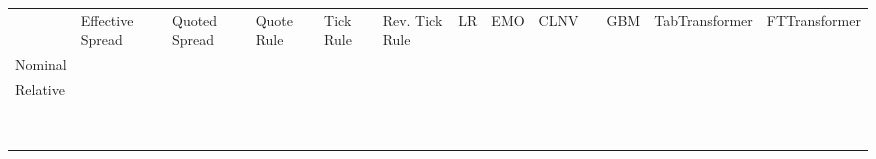 \begin{tabular}{lllllllllllll}
             & Effective Spread & Quoted Spread & Quote Rule & Tick Rule & Rev. Tick Rule & \gls{LR} & \gls{EMO} & \gls{CLNV} & \autocite{grauerOptionTradeClassification2022} & GBM & TabTransformer & FTTransformer \\
    Nominal  &               &               &            &           &                &          &           &            &                                                &     &                &               \\
    Relative &               &               &            &           &                &          &           &            &                                                &     &                &               \\
             &               &               &            &           &                &          &           &            &                                                &     &                &               \\
             &               &               &            &           &                &          &           &            &                                                &     &                &               \\
             &               &               &            &           &                &          &           &            &                                                &     &                &               \\
             &               &               &            &           &                &          &           &            &                                                &     &                &               \\
             &               &               &            &           &                &          &           &            &                                                &     &                &               \\
             &               &               &            &           &                &          &           &            &                                                &     &                &               \\
             &               &               &            &           &                &          &           &            &                                                &     &                &               \\
             &               &               &            &           &                &          &           &            &                                                &     &                &               \\
             &               &               &            &           &                &          &           &            &                                                &     &                &
\end{tabular}